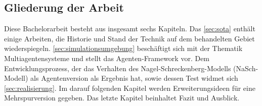 \subsection{Gliederung der Arbeit}
\label{sec:gliederung}

Diese Bachelorarbeit besteht aus insgesamt sechs Kapiteln.
Das \cref{sec:sota} enthält einige Arbeiten, die Historie und Stand der Technik auf dem behandelten Gebiet wiederspiegeln.
\cref{sec:simulationsumgebung} beschäftigt sich mit der Thematik Multiagentensysteme und stellt %
das Agenten-Framework vor.
Dem Entwicklungsprozess, der das Verhalten des Nagel-Schreckenberg-Modells (NaSch-Modell) als Agentenversion als Ergebnis hat, sowie dessen Test widmet sich \cref{sec:realisierung}.
Im darauf folgenden Kapitel werden Erweiterungsideen für eine Mehrspurversion gegeben.
Das letzte Kapitel beinhaltet Fazit und Ausblick.
